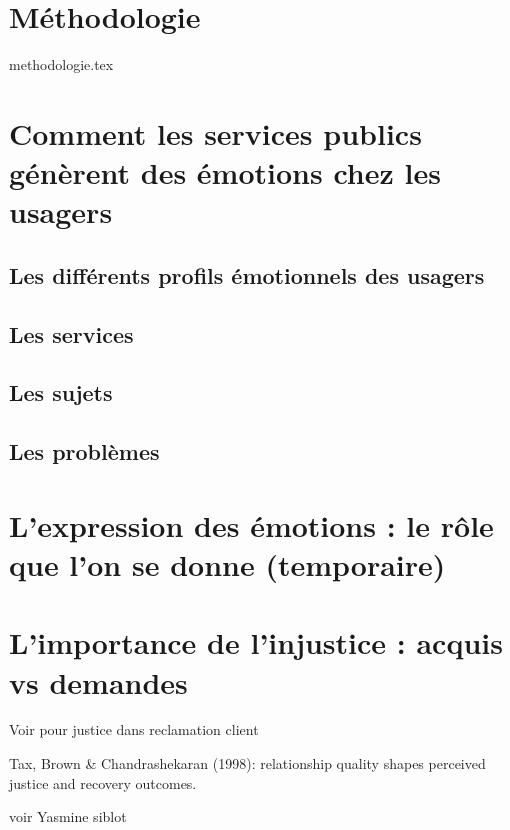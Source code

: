 \documentclass[a4paper,12pt, openany]{book}
\begin{document}
\chapter{Méthodologie}



{methodologie.tex}


\chapter{Comment les services publics génèrent des émotions chez les usagers}
\section{Les différents profils émotionnels des usagers}
\section{Les services}
\section{Les sujets}
\section{Les problèmes}
\chapter{L'expression des émotions : le rôle que l'on se donne (temporaire)}
\chapter{L'importance de l'injustice : acquis vs demandes}
Voir \textcite{blodgett97} pour justice dans reclamation client

Tax, Brown \& Chandrashekaran (1998): relationship quality shapes perceived justice and recovery outcomes.

voir Yasmine siblot

\clearpage
\newpage

\backmatter

\printbibliography

\break
\end{document}
